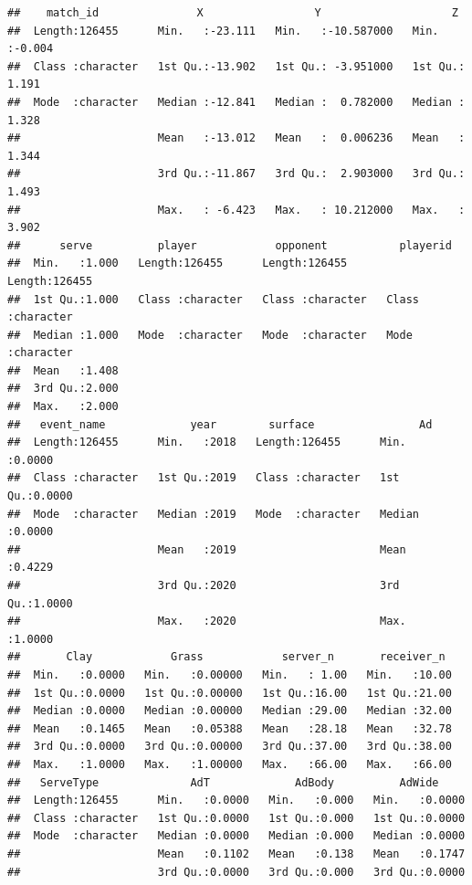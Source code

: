 \documentclass[11pt,a4paper,]{article}
\begin{document}
\begin{verbatim}
##    match_id               X                 Y                    Z         
##  Length:126455      Min.   :-23.111   Min.   :-10.587000   Min.   :-0.004  
##  Class :character   1st Qu.:-13.902   1st Qu.: -3.951000   1st Qu.: 1.191  
##  Mode  :character   Median :-12.841   Median :  0.782000   Median : 1.328  
##                     Mean   :-13.012   Mean   :  0.006236   Mean   : 1.344  
##                     3rd Qu.:-11.867   3rd Qu.:  2.903000   3rd Qu.: 1.493  
##                     Max.   : -6.423   Max.   : 10.212000   Max.   : 3.902  
##      serve          player            opponent           playerid        
##  Min.   :1.000   Length:126455      Length:126455      Length:126455     
##  1st Qu.:1.000   Class :character   Class :character   Class :character  
##  Median :1.000   Mode  :character   Mode  :character   Mode  :character  
##  Mean   :1.408                                                           
##  3rd Qu.:2.000                                                           
##  Max.   :2.000                                                           
##   event_name             year        surface                Ad        
##  Length:126455      Min.   :2018   Length:126455      Min.   :0.0000  
##  Class :character   1st Qu.:2019   Class :character   1st Qu.:0.0000  
##  Mode  :character   Median :2019   Mode  :character   Median :0.0000  
##                     Mean   :2019                      Mean   :0.4229  
##                     3rd Qu.:2020                      3rd Qu.:1.0000  
##                     Max.   :2020                      Max.   :1.0000  
##       Clay            Grass            server_n       receiver_n   
##  Min.   :0.0000   Min.   :0.00000   Min.   : 1.00   Min.   :10.00  
##  1st Qu.:0.0000   1st Qu.:0.00000   1st Qu.:16.00   1st Qu.:21.00  
##  Median :0.0000   Median :0.00000   Median :29.00   Median :32.00  
##  Mean   :0.1465   Mean   :0.05388   Mean   :28.18   Mean   :32.78  
##  3rd Qu.:0.0000   3rd Qu.:0.00000   3rd Qu.:37.00   3rd Qu.:38.00  
##  Max.   :1.0000   Max.   :1.00000   Max.   :66.00   Max.   :66.00  
##   ServeType              AdT             AdBody          AdWide      
##  Length:126455      Min.   :0.0000   Min.   :0.000   Min.   :0.0000  
##  Class :character   1st Qu.:0.0000   1st Qu.:0.000   1st Qu.:0.0000  
##  Mode  :character   Median :0.0000   Median :0.000   Median :0.0000  
##                     Mean   :0.1102   Mean   :0.138   Mean   :0.1747  
##                     3rd Qu.:0.0000   3rd Qu.:0.000   3rd Qu.:0.0000  

\end{verbatim}
\end{document}

